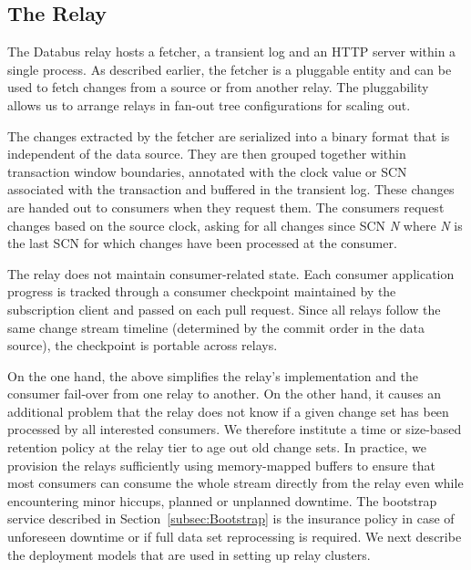 \subsection{The Relay}
\label{sec:relay}
The Databus relay hosts a fetcher, a transient log and an HTTP server within a single process. 
As described earlier, the fetcher is a pluggable entity and can be used to fetch changes from a source or from another relay. 
The pluggability allows us to arrange relays in fan-out tree configurations for scaling out. 

The changes extracted by the fetcher are serialized into a binary format that is independent of the data source. They are then grouped together within transaction window boundaries, annotated with the clock value or SCN associated with the transaction and buffered in the transient log. These changes are handed out to consumers when they request them. The consumers request changes based on the source clock, asking for all changes since SCN \emph{N} where \emph{N} is the last SCN for which changes have been processed at the consumer. 

The relay does not maintain consumer-related state. Each consumer application progress is tracked through a consumer checkpoint maintained by the subscription client and passed on each pull request. Since all relays follow the same change stream timeline (determined by the commit order in the data source), the checkpoint is portable across relays.

On the one hand, the above simplifies the relay's implementation and the consumer fail-over from one relay to another. On the other hand, it causes an additional problem that the relay does not know if a given change set has been processed by all interested consumers. We therefore institute a time or size-based retention policy at the relay tier to age out old change sets. In practice, we provision the relays sufficiently using memory-mapped buffers to ensure that most consumers can consume the whole stream directly from the relay even while encountering minor hiccups, planned or unplanned downtime. The bootstrap service described in Section~\ref{subsec:Bootstrap} is the insurance policy in case of unforeseen downtime or if full data set reprocessing is required. We next describe the deployment models that are used in setting up relay clusters. 




